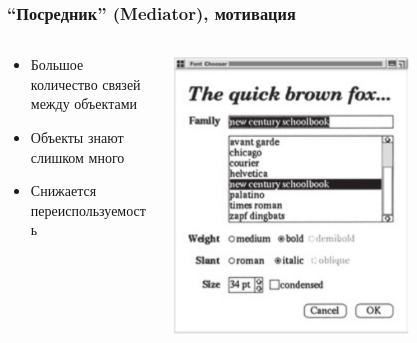 \documentclass[xetex,mathserif,serif]{beamer}
\begin{document}
	\begin{frame}
		\frametitle{``Посредник'' (Mediator), мотивация}
		\begin{columns}
			\begin{column}{0.6\textwidth}
				\begin{itemize}
					\item Большое количество связей между объектами
					\item Объекты знают слишком много
					\item Снижается переиспользуемость
				\end{itemize}
			\end{column}
			\begin{column}{0.4\textwidth}
				\begin{center}
					\includegraphics[width=0.7\textwidth]{mediatorMotivation.png}
				\end{center}
			\end{column}
		\end{columns}
	\end{frame}
\end{document}
